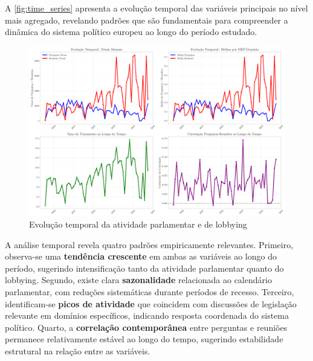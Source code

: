 A \autoref{fig:time_series} apresenta a evolução temporal das variáveis principais no nível mais agregado, revelando padrões que são fundamentais para compreender a dinâmica do sistema político europeu ao longo do período estudado.

\begin{figure}[htbp]
\centering
\includegraphics[width=\textwidth]{figures/fig2_time_series_analysis.pdf}
\caption{Evolução temporal da atividade parlamentar e de lobbying}
\label{fig:time_series}
\end{figure}

A análise temporal revela quatro padrões empiricamente relevantes. Primeiro, observa-se uma \textbf{tendência crescente} em ambas as variáveis ao longo do período, sugerindo intensificação tanto da atividade parlamentar quanto do lobbying. Segundo, existe clara \textbf{sazonalidade} relacionada ao calendário parlamentar, com reduções sistemáticas durante períodos de recesso. Terceiro, identificam-se \textbf{picos de atividade} que coincidem com discussões de legislação relevante em domínios específicos, indicando resposta coordenada do sistema político. Quarto, a \textbf{correlação contemporânea} entre perguntas e reuniões permanece relativamente estável ao longo do tempo, sugerindo estabilidade estrutural na relação entre as variáveis.

